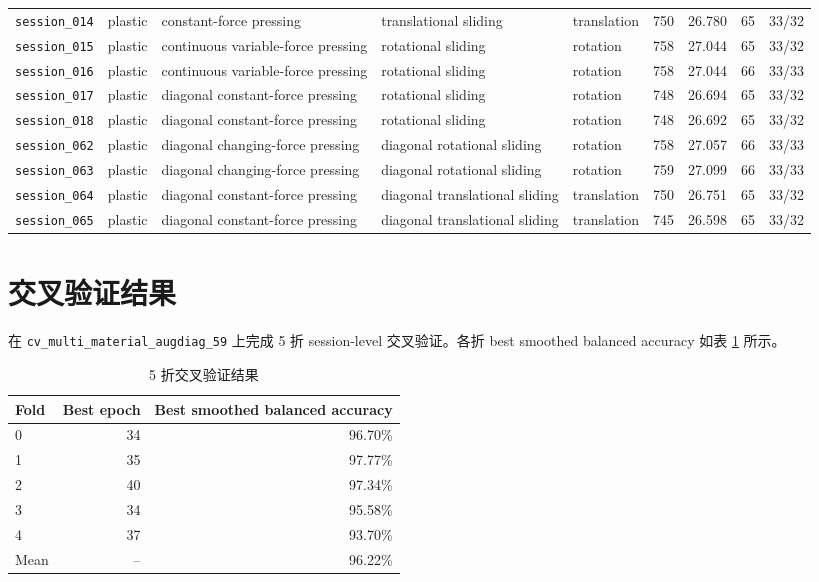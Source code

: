 \documentclass[UTF8,a4paper,11pt]{ctexart}
\begin{document}
\begin{longtable}{lp{1.55cm}p{2.7cm}p{2.65cm}lrrrr}
\texttt{session\_014} & plastic & constant-force pressing & translational sliding & translation & 750 & 26.780 & 65 & 33/32 \\
\texttt{session\_015} & plastic & continuous variable-force pressing & rotational sliding & rotation & 758 & 27.044 & 65 & 33/32 \\
\texttt{session\_016} & plastic & continuous variable-force pressing & rotational sliding & rotation & 758 & 27.044 & 66 & 33/33 \\
\texttt{session\_017} & plastic & diagonal constant-force pressing & rotational sliding & rotation & 748 & 26.694 & 65 & 33/32 \\
\texttt{session\_018} & plastic & diagonal constant-force pressing & rotational sliding & rotation & 748 & 26.692 & 65 & 33/32 \\
\texttt{session\_062} & plastic & diagonal changing-force pressing & diagonal rotational sliding & rotation & 758 & 27.057 & 66 & 33/33 \\
\texttt{session\_063} & plastic & diagonal changing-force pressing & diagonal rotational sliding & rotation & 759 & 27.099 & 66 & 33/33 \\
\texttt{session\_064} & plastic & diagonal constant-force pressing & diagonal translational sliding & translation & 750 & 26.751 & 65 & 33/32 \\
\texttt{session\_065} & plastic & diagonal constant-force pressing & diagonal translational sliding & translation & 745 & 26.598 & 65 & 33/32 \\
\bottomrule
\end{longtable}
\normalsize

\section{交叉验证结果}

在 \texttt{cv\_multi\_material\_augdiag\_59} 上完成 5 折 session-level 交叉验证。各折 best smoothed balanced accuracy 如表 \ref{tab:cv} 所示。

\begin{table}[h]
\centering
\caption{5 折交叉验证结果}
\label{tab:cv}
\begin{tabular}{lrr}
\toprule
Fold & Best epoch & Best smoothed balanced accuracy \\
\midrule
0 & 34 & 96.70\% \\
1 & 35 & 97.77\% \\
2 & 40 & 97.34\% \\
3 & 34 & 95.58\% \\
4 & 37 & 93.70\% \\
\midrule
Mean & -- & 96.22\% \\
\bottomrule
\end{tabular}
\end{table}
\end{document}

